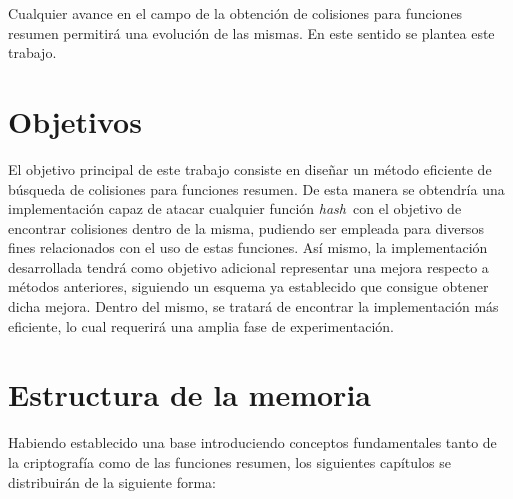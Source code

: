 \documentclass[12pt,spanish,listoffigures,listoftables,listofalgorithms]{tfgetsinf}
\newcommand{\hash}{\textit{hash}}
\begin{document}
Cualquier avance en el campo de la obtención de colisiones para funciones resumen  permitirá una evolución de las mismas. En este sentido se plantea este trabajo.

\section{Objetivos}

El objetivo principal de este trabajo consiste en diseñar un método eficiente de búsqueda de colisiones para funciones resumen. De esta manera se obtendría una implementación capaz de atacar cualquier función \hash~con el objetivo de encontrar colisiones dentro de la misma, pudiendo ser empleada para diversos fines relacionados con el uso de estas funciones. Así mismo, la implementación desarrollada tendrá como objetivo adicional representar una mejora respecto a métodos anteriores, siguiendo un esquema ya establecido que consigue obtener dicha mejora. Dentro del mismo, se tratará de encontrar la implementación más eficiente, lo cual requerirá una amplia fase de experimentación.


\section{Estructura de la memoria}

Habiendo establecido una base introduciendo conceptos fundamentales tanto de la criptografía como de las funciones resumen, los siguientes capítulos se distribuirán de la siguiente forma:
\end{document}

